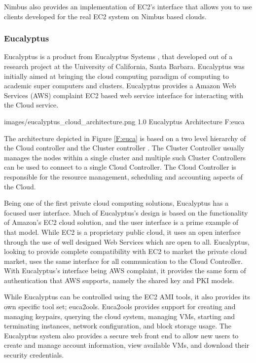 Nimbus also provides an implementation of EC2's interface that allows you to use clients developed for the real EC2 system on Nimbus based clouds.

\subsubsection{Eucalyptus}


Eucalyptus is a product from Eucalyptus Systems  \cite{nurmi2008eos, eucapyltuswp, www/eucalyptus}, that developed out of a research project at the University of California, Santa Barbara. Eucalyptus was initially aimed at bringing the cloud computing paradigm of computing to academic super computers and clusters. Eucalyptus provides a Amazon Web Services (AWS) complaint EC2 based web service interface for interacting with the Cloud service. %

  {images/eucalyptus_cloud_architecture.png}
  {1.0}
  {Eucalyptus Architecture}
  {F:euca}


 
The architecture depicted in Figure \ref{F:euca} is based on a two level hierarchy of the Cloud controller and the Cluster controller \cite{www-euca}. The Cluster Controller usually manages the nodes within a single cluster and multiple such Cluster Controllers can be used to connect to a single Cloud Controller. The Cloud Controller is responsible for the resource management, scheduling and accounting aspects of the Cloud.
 
Being one of the first private cloud computing solutions, Eucalyptus has a focused user interface.  Much of Eucalyptus's design is based on the functionality of Amazon's EC2 cloud solution, and the user interface is a prime example of that model.  While EC2 is a proprietary public cloud, it uses an open interface through the use of well designed Web Services which are open to all. Eucalyptus, looking to provide complete compatibility with EC2 to market the private cloud market, uses the same interface for all communication to the Cloud Controller.  With Eucalyptus's interface being AWS complaint, it provides the same form of authentication that AWS supports, namely the shared key and PKI  models.%

While Eucalyptus can be controlled using the EC2 AMI tools, it also provides its own specific tool set; euca2ools. Euca2ools provides support for creating and managing keypairs, querying the cloud system, managing VMs, starting and terminating instances, network configuration, and block storage usage.  The Eucalyptus system also provides a secure web front end to allow new users to create and manage account information, view available VMs, and download their security credentials. 

